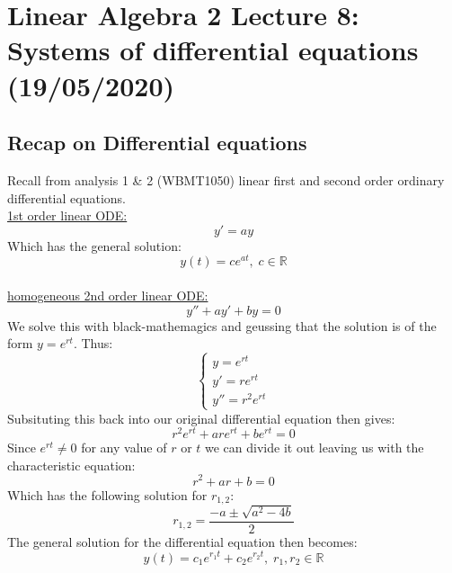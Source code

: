 \documentclass[11pt, a4paper]{article}
\newcommand*{\R}{\ensuremath{\mathbb{R}}}
\begin{document}
\setcounter{section}{7}
\setcounter{equation}{0}

\section{Linear Algebra 2 Lecture 8: Systems of differential equations (19/05/2020)}


\subsection{Recap on Differential equations}
Recall from analysis 1 \& 2 (WBMT1050) linear first and second order ordinary differential equations.\\
\underline{1st order linear ODE:}
\begin{equation*}
  y' = ay
\end{equation*}
Which has the general solution:
\begin{equation*}
  y(t) = ce^{at},\; c \in \R
\end{equation*}\\
\underline{homogeneous 2nd order linear ODE:}
\begin{equation*}
  y'' + ay' + by = 0
\end{equation*}
We solve this with black-mathemagics and geussing that the solution is of the form $y=e^{rt}$. Thus:
\begin{equation*}
  \begin{cases}
    y = e^{rt}\\
    y' = re^{rt}\\
    y'' = r^2e^{rt}
  \end{cases}
\end{equation*}
Subsituting this back into our original differential equation then gives:
\begin{equation*}
  r^2e^{rt} + are^{rt} + be^{rt} = 0
\end{equation*}
Since $e^{rt}\neq 0$ for any value of $r$ or $t$ we can divide it out leaving us with the characteristic equation:
\begin{equation*}
  r^2 + ar + b = 0
\end{equation*} 
Which has the following solution for $r_{1,2}$:
\begin{equation*}
  r_{1,2} = \frac{-a \pm \sqrt{a^2 - 4b}}{2}
\end{equation*}
The general solution for the differential equation then becomes:
\begin{equation*}
  y(t) = c_1e^{r_1t} + c_2e^{r_2t}, \; r_1, r_2 \in \R
\end{equation*}
\end{document}
